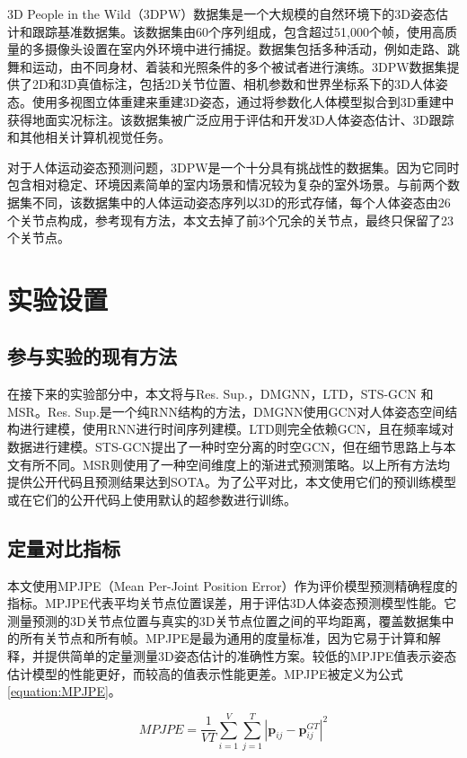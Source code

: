 3D People in the Wild（3DPW）数据集是一个大规模的自然环境下的3D姿态估计和跟踪基准数据集。该数据集由60个序列组成，包含超过51,000个帧，使用高质量的多摄像头设置在室内外环境中进行捕捉。数据集包括多种活动，例如走路、跳舞和运动，由不同身材、着装和光照条件的多个被试者进行演练。3DPW数据集提供了2D和3D真值标注，包括2D关节位置、相机参数和世界坐标系下的3D人体姿态。使用多视图立体重建来重建3D姿态，通过将参数化人体模型拟合到3D重建中获得地面实况标注。该数据集被广泛应用于评估和开发3D人体姿态估计、3D跟踪和其他相关计算机视觉任务。

对于人体运动姿态预测问题，3DPW是一个十分具有挑战性的数据集。因为它同时包含相对稳定、环境因素简单的室内场景和情况较为复杂的室外场景。与前两个数据集不同，该数据集中的人体运动姿态序列以3D的形式存储，每个人体姿态由26个关节点构成，参考现有方法，本文去掉了前3个冗余的关节点，最终只保留了23个关节点。

\section{实验设置}
\subsection{参与实验的现有方法}
在接下来的实验部分中，本文将与Res. Sup.\parencite{martinez2017human}，DMGNN\parencite{li2020dynamic}，LTD\parencite{mao2019learning}，STS-GCN\parencite{sofianos2021space} 和 MSR\parencite{dang2021msr}。Res. Sup.是一个纯RNN结构的方法，DMGNN使用GCN对人体姿态空间结构进行建模，使用RNN进行时间序列建模。LTD则完全依赖GCN，且在频率域对数据进行建模。STS-GCN提出了一种时空分离的时空GCN，但在细节思路上与本文有所不同。MSR则使用了一种空间维度上的渐进式预测策略。以上所有方法均提供公开代码且预测结果达到SOTA。为了公平对比，本文使用它们的预训练模型或在它们的公开代码上使用默认的超参数进行训练。
\subsection{定量对比指标}
本文使用MPJPE（Mean Per-Joint Position Error）作为评价模型预测精确程度的指标。MPJPE代表平均关节点位置误差，用于评估3D人体姿态预测模型性能。它测量预测的3D关节点位置与真实的3D关节点位置之间的平均距离，覆盖数据集中的所有关节点和所有帧。MPJPE是最为通用的度量标准，因为它易于计算和解释，并提供简单的定量测量3D姿态估计的准确性方案。较低的MPJPE值表示姿态估计模型的性能更好，而较高的值表示性能更差。MPJPE被定义为公式\ref{equation:MPJPE}。

\begin{equation}
    MPJPE = \frac{1}{VT}\sum_{i=1}^{V}\sum_{j=1}^{T} | \mathbf{p}_{ij} - \mathbf{p}^{GT}_{ij} |^2
    \label{equation:MPJPE}
\end{equation}


